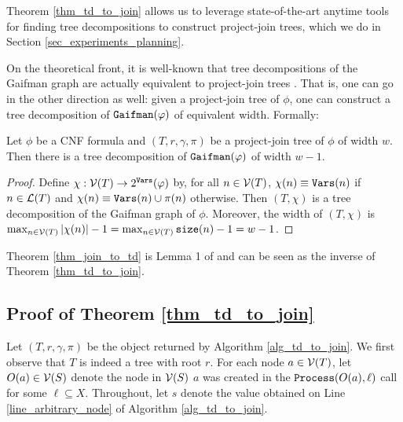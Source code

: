 Theorem \ref{thm_td_to_join} allows us to leverage state-of-the-art anytime tools for finding tree decompositions \cite{Tamaki17,strasser2017computing,AMW17} to construct project-join trees, which we do in Section \ref{sec_experiments_planning}.

On the theoretical front, it is well-known that tree decompositions of the Gaifman graph are actually equivalent to project-join trees \cite{MPPV04}.
That is, one can go in the other direction as well: given a project-join tree of $\phi$, one can construct a tree decomposition of $\texttt{\upshape Gaifman}(\varphi)$ of equivalent width.
Formally:
\begin{theorem}
\label{thm_join_to_td}
    Let $\phi$ be a CNF formula and $(T, r, \gamma, \pi)$ be a project-join tree of $\phi$ of width $w$.
    Then there is a tree decomposition of $\texttt{\upshape Gaifman}(\varphi)$ of width $w-1$.
\end{theorem}
\begin{proof}
    Define $\chi: \mathcal{V}(T) \to 2^{\texttt{\upshape Vars}}(\varphi)$ by, for all $n \in \mathcal{V}(T)$,
    $\chi(n) \equiv\texttt{\upshape Vars}(n)$ if $n \in \mathcal{L}(T)$ and $\chi(n) \equiv \texttt{\upshape Vars}(n) \cup \pi(n)$ otherwise.
    Then $(T, \chi)$ is a tree decomposition of the Gaifman graph of $\phi$.
    Moreover, the width of $(T, \chi)$ is $\max_{n \in \mathcal{V}(T)} \left| \chi (n) \right|  - 1 = \max_{n \in \mathcal{V}(T)} \texttt{\upshape size}(n) - 1 = w - 1$.
\end{proof}
Theorem \ref{thm_join_to_td} is Lemma 1 of \cite{MPPV04} and can be seen as the inverse of Theorem \ref{thm_td_to_join}.




\subsection{Proof of Theorem \ref{thm_td_to_join}}

Let $(T, r, \gamma, \pi)$ be the object returned by Algorithm \ref{alg_td_to_join}.
We first observe that $T$ is indeed a tree with root $r$.
For each node $a \in \mathcal{V}(T)$, let $O(a) \in \mathcal{V}(S)$ denote the node in $\mathcal{V}(S)$ \st{} $a$ was created in the $\texttt{\upshape Process}(O(a), \ell)$ call for some $\ell \subseteq X$.
Throughout, let $s$ denote the value obtained on Line \ref{line_arbitrary_node} of Algorithm \ref{alg_td_to_join}.
